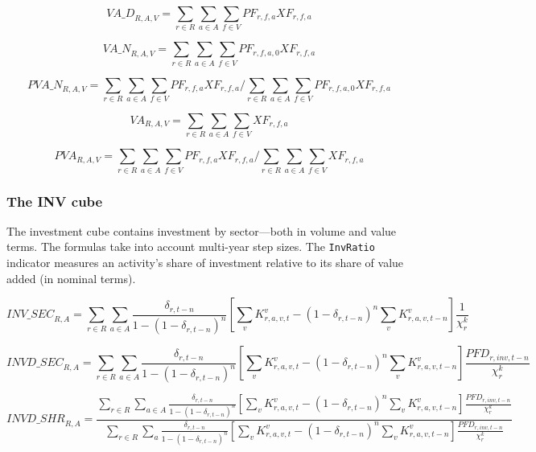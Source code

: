 \[
\mathit{VA\_D}_{R,A,V} =
\sum_{r \in R} {\sum_{a \in A} {\sum_{f \in V} {\mathit{PF}_{r,f,a}\mathit{XF}_{r,f,a}}}}
\]

\[
\mathit{VA\_N}_{R,A,V} =
\sum_{r \in R} {\sum_{a \in A} {\sum_{f \in V} {\mathit{PF}_{r,f,a,0}\mathit{XF}_{r,f,a}}}}
\]

\[
\mathit{PVA\_N}_{R,A,V} =
\sum_{r \in R} {\sum_{a \in A} {\sum_{f \in V} {\mathit{PF}_{r,f,a}\mathit{XF}_{r,f,a}}}}
\bigg/
\sum_{r \in R} {\sum_{a \in A} {\sum_{f \in V} {\mathit{PF}_{r,f,a,0}\mathit{XF}_{r,f,a}}}}
\]

\[
\mathit{VA}_{R,A,V} =
\sum_{r \in R} {\sum_{a \in A} {\sum_{f \in V} {\mathit{XF}_{r,f,a}}}}
\]

\[
\mathit{PVA}_{R,A,V} =
\sum_{r \in R} {\sum_{a \in A} {\sum_{f \in V} {\mathit{PF}_{r,f,a}\mathit{XF}_{r,f,a}}}}
\bigg/
\sum_{r \in R} {\sum_{a \in A} {\sum_{f \in V} {\mathit{XF}_{r,f,a}}}}
\]

\subsubsection{The INV cube}
The investment cube contains investment by sector---both in volume
and value terms. The formulas take into account multi-year step sizes.
The \texttt{InvRatio} indicator measures an activity's share of investment
relative to its share of value added (in nominal terms).

\[
\mathit{INV\_SEC}_{R,A} =
\sum_{r \in R} {\sum_{a \in A} {
\frac{\delta_{r,t-n}}{1-\left(1-\delta_{r,t-n}\right)^n}\left[
\sum_v{K^v_{r,a,v,t}} - \left(1-\delta_{r,t-n}\right)^n\sum_v{K^v_{r,a,v,t-n}}\right]
\frac{1}{\chi^k_r}
}}
\]

\[
\mathit{INVD\_SEC}_{R,A} =
\sum_{r \in R} {\sum_{a \in A} {
\frac{\delta_{r,t-n}}{1-\left(1-\delta_{r,t-n}\right)^n}\left[
\sum_v{K^v_{r,a,v,t}} - \left(1-\delta_{r,t-n}\right)^n\sum_v{K^v_{r,a,v,t-n}}\right]
\frac{\mathit{PFD}_{r,\mathit{inv},t-n}} {\chi^k_r}
}}
\]

\[
\mathit{INVD\_SHR}_{R,A} = \frac{
\sum_{r \in R} {\sum_{a \in A} {
\frac{\delta_{r,t-n}}{1-\left(1-\delta_{r,t-n}\right)^n}\left[
\sum_v{K^v_{r,a,v,t}} - \left(1-\delta_{r,t-n}\right)^n\sum_v{K^v_{r,a,v,t-n}}\right]
\frac{\mathit{PFD}_{r,\mathit{inv},t-n}} {\chi^k_r}
}}}
{
\sum_{r \in R} {\sum_{a} {
\frac{\delta_{r,t-n}}{1-\left(1-\delta_{r,t-n}\right)^n}\left[
\sum_v{K^v_{r,a,v,t}} - \left(1-\delta_{r,t-n}\right)^n\sum_v{K^v_{r,a,v,t-n}}\right]
\frac{\mathit{PFD}_{r,\mathit{inv},t-n}} {\chi^k_r}
}}}
\]

